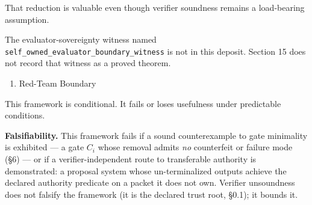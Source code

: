 \documentclass[
  10pt,
]{article}
\providecommand{\tightlist}{%
  \setlength{\itemsep}{0pt}\setlength{\parskip}{0pt}}
\providecommand{\tightlist}{%
  \setlength{\itemsep}{0pt}\setlength{\parskip}{0pt}}
\DeclareRobustCommand{\texttt}[1]{{\paperSymbolFont\nolinkurl{#1}}}
\begin{document}
That reduction is valuable even though verifier soundness remains a load-bearing assumption.

The evaluator-sovereignty witness named \texttt{self\_owned\_evaluator\_boundary\_witness} is not in this deposit. Section 15 does not record that witness as a proved theorem.

\begin{enumerate}
\def\labelenumi{\arabic{enumi}.}
\setcounter{enumi}{15}
\tightlist
\item
  Red-Team Boundary
\end{enumerate}

This framework is conditional. It fails or loses usefulness under predictable conditions.

\textbf{Falsifiability.} This framework fails if a sound counterexample to gate minimality is exhibited --- a gate \protect\hypertarget{math-E0164-0225}{}{\(C_i\)} whose removal admits \emph{no} counterfeit or failure mode (§6) --- or if a verifier-independent route to transferable authority is demonstrated: a proposal system whose un-terminalized outputs achieve the declared authority predicate on a packet it does not own. Verifier unsoundness does not falsify the framework (it is the declared trust root, §0.1); it bounds it.
\end{document}

